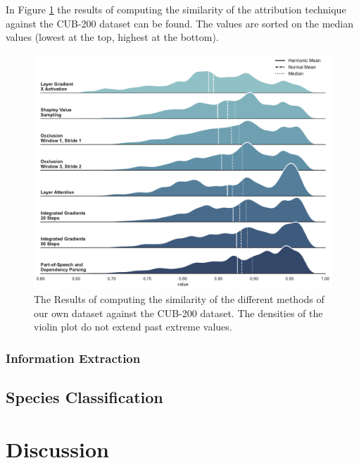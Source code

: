 \documentclass[a4paper, 12pt, oneside]{book} %
\begin{document}
In Figure \ref{fig:hmean_violin} the results of computing the similarity of the attribution technique against the CUB-200 dataset can be found.
The values are sorted on the median values (lowest at the top, highest at the bottom).


\begin{figure}[h!]
 \centering
 \includegraphics[width=\textwidth]{figures/densities.pdf}
 \caption[Similarity results]{The Results of computing the similarity of the different methods of our own dataset against the CUB-200 dataset. The densities of the violin plot do not extend past extreme values.}
 \label{fig:hmean_violin}
\end{figure}


\subsubsection{Information Extraction}



\subsection{Species Classification}


\newpage
\section{Discussion} \label{par:discussion}
\end{document}
